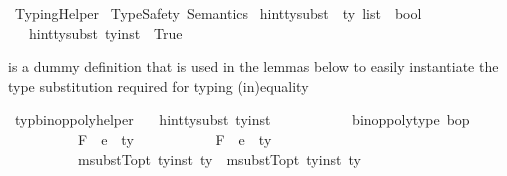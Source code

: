 %
\begin{isabellebody}%
%
%
\isadelimdocument
%
\endisadelimdocument
%
\isatagdocument
%
\isamarkuptrue%
%
\endisatagdocument
{\isafolddocument}%
%
\isadelimdocument
%
\endisadelimdocument
%
\isadelimtheory
%
\endisadelimtheory
%
\isatagtheory
{}\isamarkupfalse%
\ TypingHelper\isanewline
{}\ TypeSafety\ Semantics\isanewline
{}%
\endisatagtheory
{\isafoldtheory}%
%
\isadelimtheory
\isanewline
%
\endisadelimtheory
\isanewline
{}\isamarkupfalse%
\ hint{\isacharunderscore}{\kern0pt}ty{\isacharunderscore}{\kern0pt}subst\ {\isacharcolon}{\kern0pt}{\isacharcolon}{\kern0pt}\ {\isachardoublequoteopen}ty\ list\ {\isasymRightarrow}\ bool{\isachardoublequoteclose}\isanewline
\ \ \ {\isachardoublequoteopen}hint{\isacharunderscore}{\kern0pt}ty{\isacharunderscore}{\kern0pt}subst\ ty{\isacharunderscore}{\kern0pt}inst\ {\isacharequal}{\kern0pt}\ True{\isachardoublequoteclose}%
\begin{isamarkuptext}%
 is a dummy definition that is used in the lemmas below to easily instantiate
the type substitution required for typing (in)equality%
\end{isamarkuptext}\isamarkuptrue%
\isamarkupfalse%
\ typ{\isacharunderscore}{\kern0pt}binop{\isacharunderscore}{\kern0pt}poly{\isacharunderscore}{\kern0pt}helper{\isacharcolon}{\kern0pt}\isanewline
\ \ \ {\isachardoublequoteopen}hint{\isacharunderscore}{\kern0pt}ty{\isacharunderscore}{\kern0pt}subst\ ty{\isacharunderscore}{\kern0pt}inst{\isachardoublequoteclose}\ \isanewline
\ \ \ \ \ \ \ \ \ \ {\isachardoublequoteopen}binop{\isacharunderscore}{\kern0pt}poly{\isacharunderscore}{\kern0pt}type\ bop{\isachardoublequoteclose}\ \isanewline
\ \ \ \ \ \ \ \ \ \ {\isachardoublequoteopen}F{\isacharcomma}{\kern0pt}{\isasymDelta}\ {\isasymturnstile}\ e{}\ {\isacharcolon}{\kern0pt}\ ty{}{\isachardoublequoteclose}\ \isanewline
\ \ \ \ \ \ \ \ \ \ {\isachardoublequoteopen}F{\isacharcomma}{\kern0pt}{\isasymDelta}\ {\isasymturnstile}\ e{}\ {\isacharcolon}{\kern0pt}\ ty{}{\isachardoublequoteclose}\ \ \ \ \ \ \ \ \ \ \ \isanewline
\ \ \ \ \ \ \ \ \ \ {\isachardoublequoteopen}msubstT{\isacharunderscore}{\kern0pt}opt\ ty{\isacharunderscore}{\kern0pt}inst\ ty{}\ {\isacharequal}{\kern0pt}\ msubstT{\isacharunderscore}{\kern0pt}opt\ ty{\isacharunderscore}{\kern0pt}inst\ ty{}{\isachardoublequoteclose}\isanewline

\end{isabellebody}
